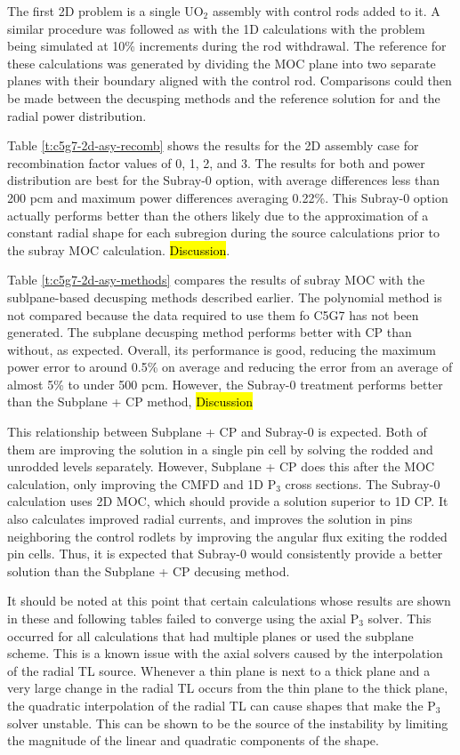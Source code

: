 The first 2D problem is a single UO$_2$ assembly with control rods added to it.  A similar procedure was followed as with the 1D calculations with the problem being simulated at 10\% increments during the rod withdrawal.  The reference for these calculations was generated by dividing the MOC plane into two separate planes with their boundary aligned with the control rod.  Comparisons could then be made between the decusping methods and the reference solution for \keff{} and the radial power distribution.

Table \ref{t:c5g7-2d-asy-recomb} shows the results for the 2D assembly case for recombination factor values of 0, 1, 2, and 3.  The results for both \keff{} and power distribution are best for the Subray-0 option, with average \keff{} differences less than 200 pcm and maximum power differences averaging 0.22\%.  This Subray-0 option actually performs better than the others likely due to the approximation of a constant radial shape for each subregion during the source calculations prior to the subray MOC calculation.  \hl{Discussion}.

Table \ref{t:c5g7-2d-asy-methods} compares the results of subray MOC with the sublpane-based decusping methods described earlier.  The polynomial method is not compared because the data required to use them fo C5G7 has not been generated.  The subplane decusping method performs better with CP than without, as expected.  Overall, its performance is good, reducing the maximum power error to around 0.5\% on average and reducing the \keff{} error from an average of almost 5\% to under 500 pcm.  However, the Subray-0 treatment performs better than the Subplane + CP method, \hl{Discussion}

This relationship between Subplane + CP and Subray-0 is expected.  Both of them are improving the solution in a single pin cell by solving the rodded and unrodded levels separately.  However, Subplane + CP does this after the MOC calculation, only improving the CMFD and 1D P$_3$ cross sections.  The Subray-0 calculation uses 2D MOC, which should provide a solution superior to 1D CP.  It also calculates improved radial currents, and improves the solution in pins neighboring the control rodlets by improving the angular flux exiting the rodded pin cells.  Thus, it is expected that Subray-0 would consistently provide a better solution than the Subplane + CP decusing method.

It should be noted at this point that certain calculations whose results are shown in these and following tables failed to converge using the axial P$_3$ solver.  This occurred for all calculations that had multiple planes or used the subplane scheme.  This is a known issue with the axial solvers caused by the interpolation of the radial TL source.  Whenever a thin plane is next to a thick plane and a very large change in the radial TL occurs from the thin plane to the thick plane, the quadratic interpolation of the radial TL can cause shapes that make the P$_3$ solver unstable.  This can be shown to be the source of the instability by limiting the magnitude of the linear and quadratic components of the shape.

